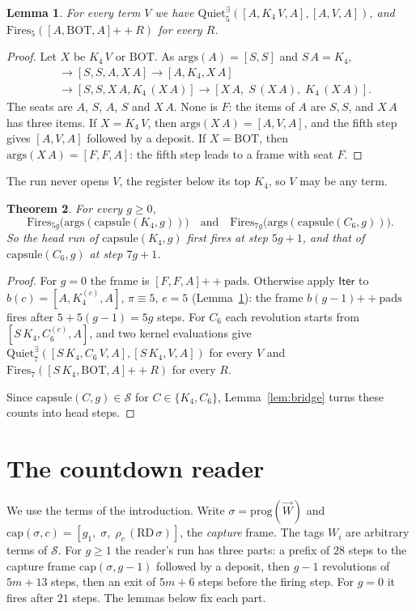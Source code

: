 \documentclass[11pt]{amsart}
\newtheorem{theorem}{Theorem}
\newtheorem{lemma}[theorem]{Lemma}
\theoremstyle{definition}
\newcommand{\Ter}{\mathcal S}
\newcommand{\app}{\mathbin{+\!\!+}}
\newcommand{\args}{\mathrm{args}}
\newcommand{\Fires}{\mathrm{Fires}}
\newcommand{\QuietD}{\mathrm{Quiet}^{\exists}}
\newcommand{\BOT}{\mathrm{BOT}}
\newcommand{\RD}{\mathrm{RD}}
\newcommand{\capf}{\mathrm{cap}}
\newcommand{\prog}{\mathrm{prog}}
\newcommand{\cps}{\mathrm{capsule}}
\newcommand{\pads}{\mathrm{pads}}
\newcommand{\Iter}{\mathsf{Iter}}
\begin{document}
\begin{lemma}\label{lem:k4}
For every term $V$ we have $\QuietD_5([A,K_4\,V,A],[A,V,A])$, and
$\Fires_5([A,\BOT,A]\app R)$ for every $R$.
\end{lemma}

\begin{proof}
Let $X$ be $K_4\,V$ or $\BOT$. As $\args(A)=[S,S]$ and $S\,A=K_4$,
\begin{align*}
[A,X,A]&\to[S,S,A,X\,A]\to[A,K_4,X\,A]\\
&\to[S,S,X\,A,K_4\,(X\,A)]\to[X\,A,\;S\,(X\,A),\;K_4\,(X\,A)].
\end{align*}
The seats are $A$, $S$, $A$, $S$ and $X\,A$. None is $F$: the items of $A$ are $S,S$, and $X\,A$
has three items. If $X=K_4\,V$, then $\args(X\,A)=[A,V,A]$, and the fifth step gives $[A,V,A]$
followed by a deposit. If $X=\BOT$, then $\args(X\,A)=[F,F,A]$: the fifth step leads to
a frame with seat $F$.
\end{proof}

The run never opens $V$, the register below its top $K_4$, so $V$ may be any term.

\begin{theorem}\label{thm:capsules}
For every $g\ge0$,
\[
\Fires_{5g}\bigl(\args(\cps(K_4,g))\bigr)\quad\text{and}\quad\Fires_{7g}\bigl(\args(\cps(C_6,g))\bigr).
\]
So the head run of $\cps(K_4,g)$ first fires at step $5g+1$, and that of $\cps(C_6,g)$ at step $7g+1$.
\end{theorem}

\begin{proof}
For $g=0$ the frame is $[F,F,A]\app\pads$. Otherwise apply $\Iter$ to $b(c)=[A,K_4^{(c)},A]$,
$\pi\equiv5$, $e=5$ (Lemma~\ref{lem:k4}): the frame $b(g-1)\app\pads$ fires after
$5+5(g-1)=5g$ steps. For $C_6$ each revolution starts from $[S\,K_4,C_6^{(c)},A]$, and two kernel
evaluations give $\QuietD_7([S\,K_4,C_6\,V,A],[S\,K_4,V,A])$ for every $V$ and
$\Fires_7([S\,K_4,\BOT,A]\app R)$ for every $R$.

Since $\cps(C,g)\in\Ter$ for $C\in\{K_4,C_6\}$, Lemma~\ref{lem:bridge} turns these counts into
head steps.
\end{proof}

\section{The countdown reader}\label{sec:reader}

We use the terms of the introduction. Write $\sigma=\prog(\vec W)$ and
$\capf(\sigma,c)=[g_1,\;\sigma,\;\rho_c\,(\RD\,\sigma)]$, the \emph{capture} frame. The tags $W_i$
are arbitrary terms of $\Ter$. For $g\ge1$ the reader's run has three parts: a prefix of $28$ steps
to the capture frame $\capf(\sigma,g-1)$ followed by a deposit, then $g-1$ revolutions of $5m+13$
steps, then an exit of $5m+6$ steps before the firing step. For $g=0$ it fires after $21$ steps.
The lemmas below fix each part.
\end{document}
